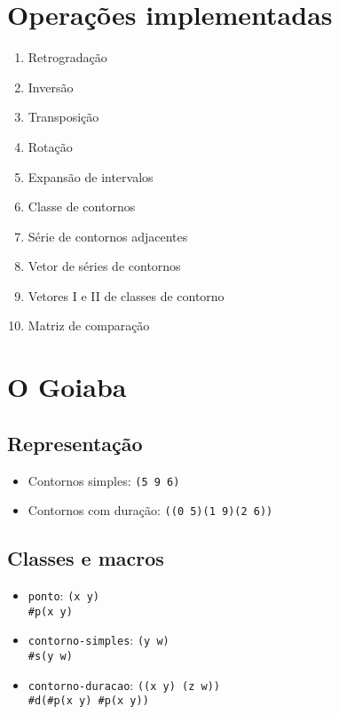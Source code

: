 \documentclass[brazil,12pt,plain]{article}
\newcommand{\code}[1]{\texttt{#1}}
\begin{document}
\section{Operações implementadas}
\label{sec:oper-impl}

\begin{enumerate}
\item Retrogradação
\item Inversão
\item Transposição
\item Rotação
\item Expansão de intervalos
\item Classe de contornos
\item Série de contornos adjacentes
\item Vetor de séries de contornos
\item Vetores I e II de classes de contorno
\item Matriz de comparação
\end{enumerate}

\section{O Goiaba}
\label{sec:o-goiaba}

\subsection{Representação}
\label{sec:representacao}

\begin{itemize}
\item Contornos simples: \code{(5 9 6)}
\item Contornos com duração: \code{((0 5)(1 9)(2 6))}
\end{itemize}

\subsection{Classes e macros}
\label{sec:classes-e-macros}

\begin{itemize}
\item \texttt{ponto}: \code{(x y)}\\
  \code{\#p(x y)}
\item \texttt{contorno-simples}: \code{(y w)}\\
  \code{\#s(y w)}
\item \texttt{contorno-duracao}: \code{((x y) (z
    w))}\\
  \code{\#d(\#p(x y) \#p(x y))}
\end{itemize}
\end{document}
